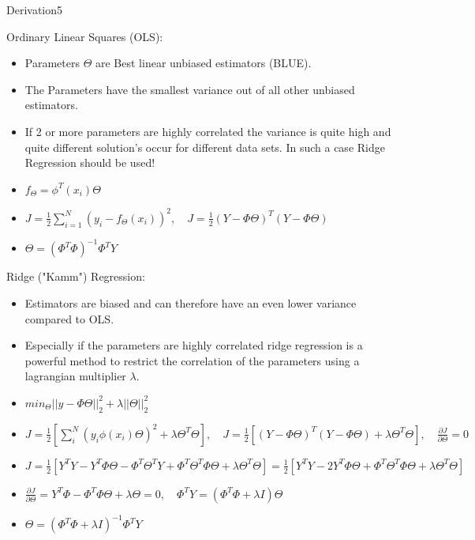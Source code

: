 \begin{questions}
\begin{question}[bonus]{Derivation}{5}
\begin{answer}
		
		Ordinary Linear Squares (OLS):
		\begin{itemize}
			\item Parameters $\Theta$ are Best linear unbiased estimators (BLUE).
			\item The Parameters have the smallest variance out of all other unbiased estimators.
			\item If 2 or more parameters are highly correlated the variance is quite high and quite different solution's occur for different data sets. In such a case Ridge Regression should be used! 
			\item $f_{\Theta}=\phi^T(x_i) \Theta$
			\item $J=\frac{1}{2} \sum_{i=1}^{N} (y_i - f_{\Theta}(x_i))^2, \quad J=\frac{1}{2}(Y-\Phi \Theta)^T (Y-\Phi \Theta)$
			\item $\Theta = (\Phi^T \Phi)^{-1} \Phi^T Y$
		\end{itemize}
		\bigskip
		Ridge ("Kamm") Regression:
		\begin{itemize}
			\item Estimators are biased and can therefore have an even lower variance compared to OLS.
			\item Especially if the parameters are highly correlated ridge regression is a powerful method to restrict the correlation of the parameters using a 
			lagrangian multiplier $\lambda$.
			\item $min_\Theta ||y-\Phi \Theta||^2_2+\lambda ||\Theta||^2_2 $
			\item $J=\frac{1}{2} [ \sum_i^N (y_i \phi(x_i) \Theta)^2+\lambda \Theta^T \Theta], \quad J=\frac{1}{2}[(Y-\Phi \Theta)^T (Y-\Phi \Theta)+\lambda \Theta^T \Theta],\quad \frac{\partial J}{\partial \Theta}=0$
			\item $J=\frac{1}{2}[Y^T Y-Y^T \Phi \Theta - \Phi^T \Theta^T Y + \Phi^T \Theta^T \Phi \Theta+\lambda \Theta^T \Theta] = \frac{1}{2}[Y^T Y-2Y^T \Phi \Theta+ \Phi^T \Theta^T \Phi \Theta+\lambda \Theta^T \Theta]$
			\item $\frac{\partial J}{\partial \Theta}=Y^T \Phi - \Phi^T \Phi \Theta +\lambda \Theta = 0, \quad \Phi^T Y = (\Phi^T \Phi + \lambda I) \Theta$
			\item $\Theta = (\Phi^T \Phi+\lambda I)^{-1} \Phi^T Y$
		\end{itemize}
		

\end{answer}
\end{question}
\end{questions}
